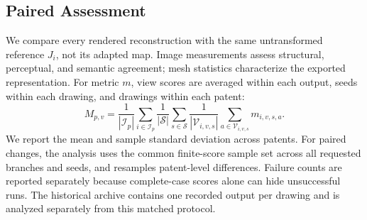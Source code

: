 \subsection{Paired Assessment}
We compare every rendered reconstruction with the same untransformed reference
$J_i$, not its adapted map. Image measurements assess structural, perceptual,
and semantic agreement; mesh statistics characterize the exported representation.
For metric $m$, view scores are averaged within each output, seeds within each
drawing, and drawings within each patent:
\begin{equation}
 M_{p,v}=\frac{1}{|\mathcal I_p|}\sum_{i\in\mathcal I_p}
 \frac{1}{|\mathcal S|}\sum_{s\in\mathcal S}
 \frac{1}{|\mathcal V_{i,v,s}|}\sum_{a\in\mathcal V_{i,v,s}}m_{i,v,s,a}.
\end{equation}
We report the mean and sample standard deviation across patents. For paired
changes, the analysis uses the common finite-score sample set across all
requested branches and seeds, and resamples patent-level differences.
Failure counts are reported separately because complete-case scores alone can
hide unsuccessful runs. The historical archive contains one recorded output per
drawing and is analyzed separately from this matched protocol.
